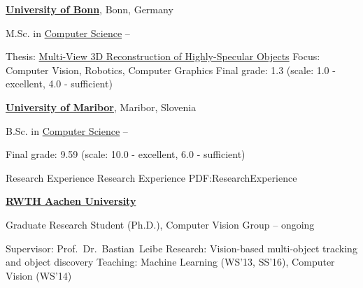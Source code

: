 \documentclass[letterpaper,MMMyyyy,nonstopmode]{simpleresumecv}
\begin{document}
\begin{Body}


\BigGap
\Entry
\href{https://www.uni-bonn.de/}
{\textbf{University of Bonn}},
Bonn, Germany

\Gap
\BulletItem
M.Sc. in
\href{https://www.informatik.uni-bonn.de/de/fuer-studierende/master-of-science-in-computer-science}
{Computer Science}
\hfill
{} --
\begin{Detail}
\SubBulletItem
Thesis:
\href{https://www.vision.rwth-aachen.de/media/papers/thesis_doc.pdf}
{Multi-View 3D Reconstruction of Highly-Specular Objects}
\SubBulletItem
Focus:
Computer Vision, Robotics, Computer Graphics
%
\SubBulletItem
Final grade: 1.3 (scale: 1.0 - excellent, 4.0 - sufficient)
\end{Detail}


\BigGap
\Entry
\href{https://www.um.si}
{\textbf{University of Maribor}},
Maribor, Slovenia

\Gap
\BulletItem
B.Sc. in
\href{https://feri.um.si/en/}
{Computer Science}
\hfill
{} --
\begin{Detail}
\SubBulletItem
Final grade: 9.59 (scale: 10.0 - excellent, 6.0 - sufficient)
\end{Detail}


\Section
{Research Experience}
{Research Experience}
{PDF:ResearchExperience}

\Entry
\href{http://www.rwth-aachen.de}
{\textbf{RWTH Aachen University}}

\Gap
\BulletItem
Graduate Research Student (Ph.D.), Computer Vision Group
\hfill
{} -- ongoing
\begin{Detail}
\SubBulletItem
Supervisor:
Prof.~Dr.~Bastian~Leibe
\SubBulletItem
Research:
Vision-based multi-object tracking and object discovery
\SubBulletItem
Teaching: Machine Learning (WS'13, SS'16), Computer Vision (WS'14)
\end{Detail}


\end{Body}
\end{document}
